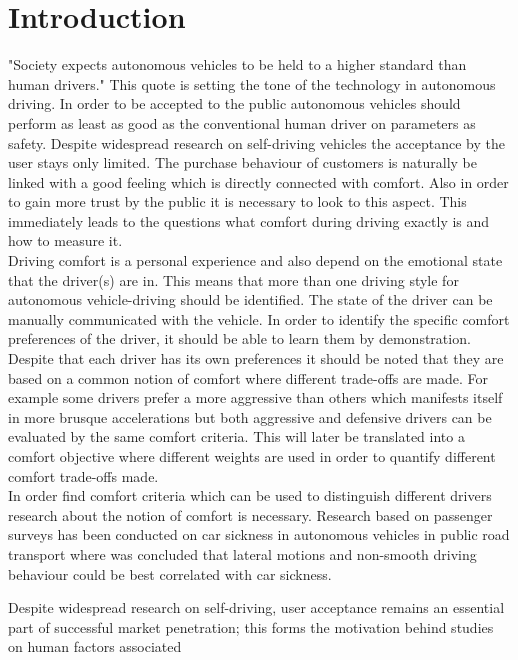 \chapter{Introduction}
\label{cha:intro}
"Society expects autonomous vehicles to be held to a higher standard than human drivers." \cite{Prof.Amnon} This quote is setting the tone of the technology in autonomous driving. In order to be accepted to the public autonomous vehicles should perform as least as good as the conventional human driver on parameters as safety. Despite widespread research on self-driving vehicles the acceptance by the user stays only limited.\cite{Bae2019} The purchase behaviour of customers is naturally be linked with a good feeling which is directly connected with comfort. Also in order to gain more trust by the public it is necessary to look to this aspect. This immediately leads to the questions what comfort during driving exactly is and how to measure it.\\

Driving comfort is a personal experience and also depend on the emotional state that the driver(s) are in. This means that more than one driving style for autonomous vehicle-driving should be identified. The state of the driver can be manually communicated with the vehicle. \cite{Eindhoven2019} In order to identify the specific comfort preferences of the driver, it should be able to learn them by demonstration. \cite{Kuderer2015a}\\
Despite that each driver has its own preferences it should be noted that they are based on a common notion of comfort where different trade-offs are made. For example some drivers prefer a more aggressive than others which manifests itself in more brusque accelerations but both aggressive and defensive drivers can be evaluated by the same comfort criteria. This will later be translated into a comfort objective where different weights are used in order to quantify different comfort trade-offs made. \\

In order find comfort criteria which can be used to distinguish different drivers research about the notion of comfort is necessary. Research based on passenger surveys has been conducted on car sickness in autonomous vehicles in public road transport \cite{Turner1999} where was concluded that lateral motions and non-smooth driving behaviour could be best correlated with car sickness. 



Despite widespread research on self-driving, user acceptance remains an essential part of successful market penetration; this forms the motivation behind studies on human factors associated

